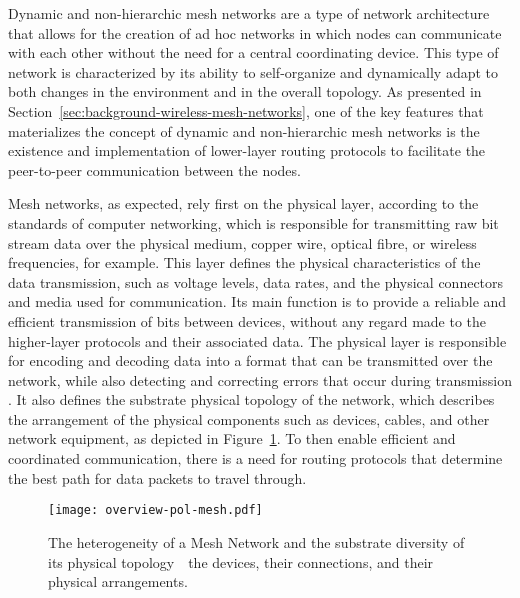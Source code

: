 Dynamic and non-hierarchic mesh networks are a type of network architecture that allows for the creation of ad hoc networks in which nodes can communicate with each other without the need for a central coordinating device. This type of network is characterized by its ability to self-organize and dynamically adapt to both changes in the environment and in the overall topology. As presented in Section~\ref{sec:background-wireless-mesh-networks}, one of the key features that materializes the concept of dynamic and non-hierarchic mesh networks is the existence and implementation of lower-layer routing protocols to facilitate the peer-to-peer communication between the nodes.

Mesh networks, as expected, rely first on the physical layer, according to the standards of computer networking, which is responsible for transmitting raw bit stream data over the physical medium, copper wire, optical fibre, or wireless frequencies, for example. This layer defines the physical characteristics of the data transmission, such as voltage levels, data rates, and the physical connectors and media used for communication. Its main function is to provide a reliable and efficient transmission of bits between devices, without any regard made to the higher-layer protocols and their associated data. The physical layer is responsible for encoding and decoding data into a format that can be transmitted over the network, while also detecting and correcting errors that occur during transmission \cite{peterson2007computer}. It also defines the substrate physical topology of the network, which describes the arrangement of the physical components such as devices, cables, and other network equipment, as depicted in Figure~\ref{fig:proof-of-location-overview-pol-mesh}. To then enable efficient and coordinated communication, there is a need for routing protocols that determine the best path for data packets to travel through.

\begin{figure}[h!]
    \begin{center}
    \texttt{[image: overview-pol-mesh.pdf]}
    \caption{The heterogeneity of a Mesh Network and the substrate diversity of its physical topology~\textemdash~the devices, their connections, and their physical arrangements.}
    \label{fig:proof-of-location-overview-pol-mesh}
    \end{center}
\end{figure}

